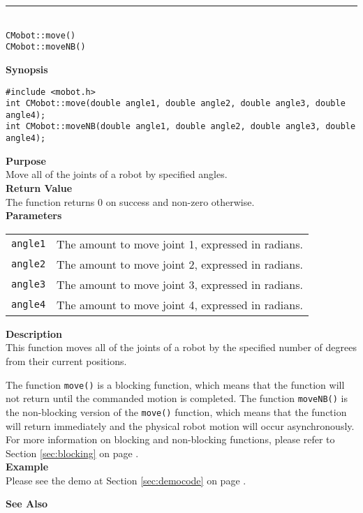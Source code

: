 \noindent
\vspace{5pt}
\rule{4.5in}{0.015in}\\
\noindent
{\LARGE \texttt{CMobot::move()}}\\
{\LARGE \texttt{CMobot::moveNB()}}\\
{}

\noindent
{\bf Synopsis}
\begin{verbatim}
#include <mobot.h>
int CMobot::move(double angle1, double angle2, double angle3, double angle4);
int CMobot::moveNB(double angle1, double angle2, double angle3, double angle4);
\end{verbatim}

\noindent
{\bf Purpose}\\
Move all of the joints of a robot by specified angles.\\

\noindent
{\bf Return Value}\\
The function returns 0 on success and non-zero otherwise.\\

\noindent
{\bf Parameters}\\
\vspace{-0.1in}
\begin{description}
\item               
\begin{tabular}{p{15 mm}p{105 mm}}
\texttt{angle1} & The amount to move joint 1, expressed in radians. \\
\texttt{angle2} & The amount to move joint 2, expressed in radians. \\
\texttt{angle3} & The amount to move joint 3, expressed in radians. \\
\texttt{angle4} & The amount to move joint 4, expressed in radians. \\
\end{tabular}
\end{description}
\noindent
{\bf Description}\\
This function moves all of the joints of a robot by the specified number of degrees
from their current positions. 

The function \texttt{move()} is a blocking function,
which means that the function will not return until the commanded motion is 
completed. The function \texttt{moveNB()} is the non-blocking version of
the \texttt{move()} function, which means that the function will return
immediately and the physical robot motion will occur asynchronously. For 
more information on blocking and non-blocking functions, please refer to 
Section \ref{sec:blocking} on page \pageref{sec:blocking}.\\

\noindent
{\bf Example}\\
Please see the demo at Section \ref{sec:democode} on page \pageref{sec:democode}.\\
\noindent

\noindent
{\bf See Also}\\

